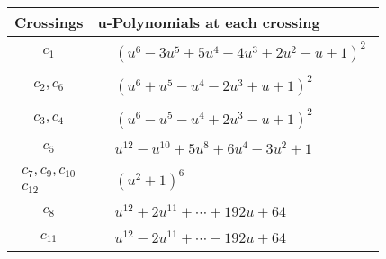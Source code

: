 \documentclass[1p]{elsarticle_modified}
\theoremstyle{definition}
\begin{document}
\begin{tabular}{m{50pt}|m{274pt}}
Crossings & \hspace{64pt}u-Polynomials at each crossing \\
\hline $$\begin{aligned}c_{1}\end{aligned}$$&$\begin{aligned}
&(u^6-3 u^5+5 u^4-4 u^3+2 u^2- u+1)^2
\end{aligned}$\\
\hline $$\begin{aligned}c_{2},c_{6}\end{aligned}$$&$\begin{aligned}
&(u^6+u^5- u^4-2 u^3+u+1)^2
\end{aligned}$\\
\hline $$\begin{aligned}c_{3},c_{4}\end{aligned}$$&$\begin{aligned}
&(u^6- u^5- u^4+2 u^3- u+1)^2
\end{aligned}$\\
\hline $$\begin{aligned}c_{5}\end{aligned}$$&$\begin{aligned}
&u^{12}- u^{10}+5 u^8+6 u^4-3 u^2+1
\end{aligned}$\\
\hline $$\begin{aligned}c_{7},c_{9},c_{10}\\c_{12}\end{aligned}$$&$\begin{aligned}
&(u^2+1)^6
\end{aligned}$\\
\hline $$\begin{aligned}c_{8}\end{aligned}$$&$\begin{aligned}
&u^{12}+2 u^{11}+\cdots+192 u+64
\end{aligned}$\\
\hline $$\begin{aligned}c_{11}\end{aligned}$$&$\begin{aligned}
&u^{12}-2 u^{11}+\cdots-192 u+64
\end{aligned}$\\
\hline
\end{tabular}\\~\\
\newpage\renewcommand{\arraystretch}{1}
\end{document}
